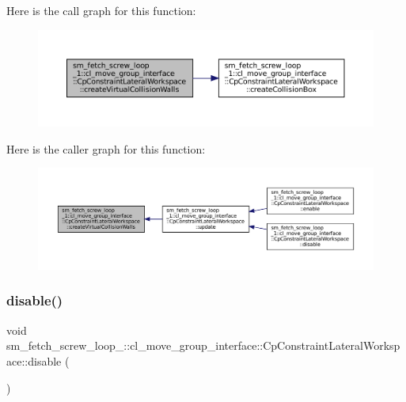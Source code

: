 Here is the call graph for this function\+:
\nopagebreak
\begin{figure}[H]
\begin{center}
\leavevmode
\includegraphics[width=350pt]{classsm__fetch__screw__loop__1_1_1cl__move__group__interface_1_1CpConstraintLateralWorkspace_a090af6376b13560ccbbb7332ebb0b003_cgraph}
\end{center}
\end{figure}
Here is the caller graph for this function\+:
\nopagebreak
\begin{figure}[H]
\begin{center}
\leavevmode
\includegraphics[width=350pt]{classsm__fetch__screw__loop__1_1_1cl__move__group__interface_1_1CpConstraintLateralWorkspace_a090af6376b13560ccbbb7332ebb0b003_icgraph}
\end{center}
\end{figure}
\mbox{\label{classsm__fetch__screw__loop__1_1_1cl__move__group__interface_1_1CpConstraintLateralWorkspace_abc8e58c6bed792a56bfa9cad3f80d69e}} 
\subsubsection{\texorpdfstring{disable()}{disable()}}
{\footnotesize\ttfamily void sm\+\_\+fetch\+\_\+screw\+\_\+loop\+\_\+::cl\+\_\+move\+\_\+group\+\_\+interface\+::\+Cp\+Constraint\+Lateral\+Workspace\+::disable (\begin{DoxyParamCaption}{ }\end{DoxyParamCaption})}



